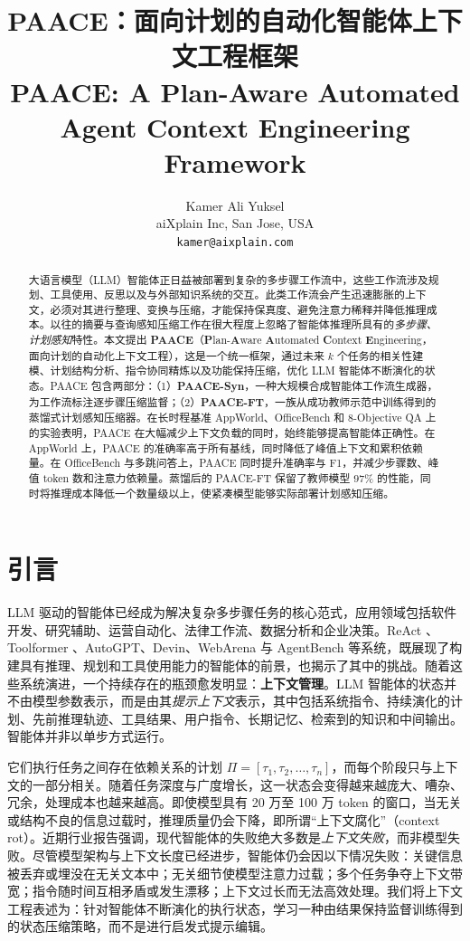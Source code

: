 \documentclass[10pt,twocolumn]{article}
\title{\vspace{-1.2em}\textbf{PAACE：面向计划的自动化智能体上下文工程框架}\\[-0.15em]
\large PAACE: A Plan-Aware Automated Agent Context Engineering Framework}
\author{Kamer Ali Yuksel\\\small aiXplain Inc, San Jose, USA\\\small \texttt{kamer@aixplain.com}}
\date{}
\newcommand{\PAACE}{\textbf{PAACE}}
\begin{document}
\maketitle
\vspace{-1.6em}

\begin{abstract}
大语言模型（LLM）智能体正日益被部署到复杂的多步骤工作流中，这些工作流涉及规划、工具使用、反思以及与外部知识系统的交互。此类工作流会产生迅速膨胀的上下文，必须对其进行整理、变换与压缩，才能保持保真度、避免注意力稀释并降低推理成本。以往的摘要与查询感知压缩工作在很大程度上忽略了智能体推理所具有的\emph{多步骤、计划感知}特性。本文提出 \PAACE（\textbf{P}lan-\textbf{A}ware \textbf{A}utomated \textbf{C}ontext \textbf{E}ngineering，面向计划的自动化上下文工程），这是一个统一框架，通过未来 $k$ 个任务的相关性建模、计划结构分析、指令协同精炼以及功能保持压缩，优化 LLM 智能体不断演化的状态。PAACE 包含两部分：（1）\textbf{PAACE-Syn}，一种大规模合成智能体工作流生成器，为工作流标注逐步骤压缩监督；（2）\textbf{PAACE-FT}，一族从成功教师示范中训练得到的蒸馏式计划感知压缩器。在长时程基准 AppWorld、OfficeBench 和 8-Objective QA 上的实验表明，PAACE 在大幅减少上下文负载的同时，始终能够提高智能体正确性。在 AppWorld 上，PAACE 的准确率高于所有基线，同时降低了峰值上下文和累积依赖量。在 OfficeBench 与多跳问答上，PAACE 同时提升准确率与 F1，并减少步骤数、峰值 token 数和注意力依赖量。蒸馏后的 PAACE-FT 保留了教师模型 $97\%$ 的性能，同时将推理成本降低一个数量级以上，使紧凑模型能够实际部署计划感知压缩。
\end{abstract}

\section{引言}

LLM 驱动的智能体已经成为解决复杂多步骤任务的核心范式，应用领域包括软件开发、研究辅助、运营自动化、法律工作流、数据分析和企业决策。ReAct \citep{react}、Toolformer \citep{toolformer}、AutoGPT、Devin、WebArena \citep{webarena} 与 AgentBench \citep{agentbench} 等系统，既展现了构建具有推理、规划和工具使用能力的智能体的前景，也揭示了其中的挑战。随着这些系统演进，一个持续存在的瓶颈愈发明显：\textbf{上下文管理}。LLM 智能体的状态并不由模型参数表示，而是由其\emph{提示上下文}表示，其中包括系统指令、持续演化的计划、先前推理轨迹、工具结果、用户指令、长期记忆、检索到的知识和中间输出。智能体并非以单步方式运行。

它们执行任务之间存在依赖关系的计划 $\Pi=[\tau_1,\tau_2,\ldots,\tau_n]$，而每个阶段只与上下文的一部分相关。随着任务深度与广度增长，这一状态会变得越来越庞大、嘈杂、冗余，处理成本也越来越高。即使模型具有 20 万至 100 万 token 的窗口，当无关或结构不良的信息过载时，推理质量仍会下降，即所谓“上下文腐化”（context rot）。近期行业报告强调，现代智能体的失败绝大多数是\emph{上下文失败}，而非模型失败。尽管模型架构与上下文长度已经进步，智能体仍会因以下情况失败：关键信息被丢弃或埋没在无关文本中；无关细节使模型注意力过载；多个任务争夺上下文带宽；指令随时间互相矛盾或发生漂移；上下文过长而无法高效处理。我们将上下文工程表述为：针对智能体不断演化的执行状态，学习一种由结果保持监督训练得到的状态压缩策略，而不是进行启发式提示编辑。
\end{document}
